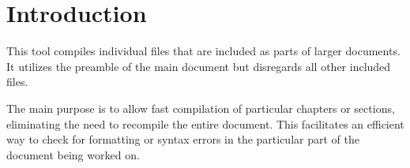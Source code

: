 
\section{Introduction}
This tool compiles individual files that are included as parts of larger documents. 
It utilizes the preamble of the main document but disregards all other included files.

The main purpose is to allow fast compilation of particular chapters or sections, 
eliminating the need to recompile the entire document.
This facilitates an efficient way to check for formatting or syntax errors in
the particular part of the document being worked on.

